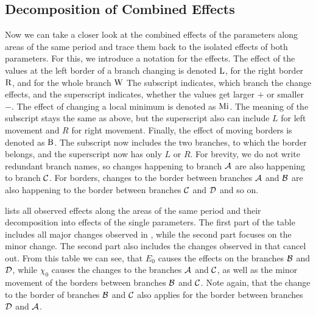 \subsection{Decomposition of Combined Effects}
\label{sec:yunus.param.effects.decomposition}

Now we can take a closer look at the combined effects of the parameters along areas of the same period and trace them back to the isolated effects of both parameters.
For this, we introduce a notation for the effects.
The effect of the values at the left border of a branch changing is denoted $\operatorname{L}$, for the right border $\operatorname{R}$, and for the whole branch $\operatorname{W}$
The subscript indicates, which branch the change effects, and the superscript indicates, whether the values get larger $+$ or smaller $-$.
The effect of changing a local minimum is denoted as $\operatorname{Mi}$.
The meaning of the subscript stays the same as above, but the superscript also can include $L$ for left movement and $R$ for right movement.
Finally, the effect of moving borders is denoted as $\operatorname{B}$.
The subscript now includes the two branches, to which the border belongs, and the superscript now has only $L$ or $R$.
For brevity, we do not write redundant branch names, so changes happening to branch $\mathcal{A}$ are also happening to branch $\mathcal{C}$.
For borders, changes to the border between branches $\mathcal{A}$ and $\mathcal{B}$ are also happening to the border between branches $\mathcal{C}$ and $\mathcal{D}$ and so on.

 lists all observed effects along the areas of the same period and their decomposition into effects of the single parameters.
The first part of the table includes all major changes observed in , while the second part focuses on the minor change.
The second part also includes the changes observed in  that cancel out.
From this table we can see, that $E_0$ causes the effects on the branches $\mathcal{B}$ and $\mathcal{D}$, while $\chi_0$ causes the changes to the branches $\mathcal{A}$ and $\mathcal{C}$, as well as the minor movement of the borders between branches $\mathcal{B}$ and $\mathcal{C}$.
Note again, that the change to the border of branches $\mathcal{B}$ and $\mathcal{C}$ also applies for the border between branches $\mathcal{D}$ and $\mathcal{A}$.

